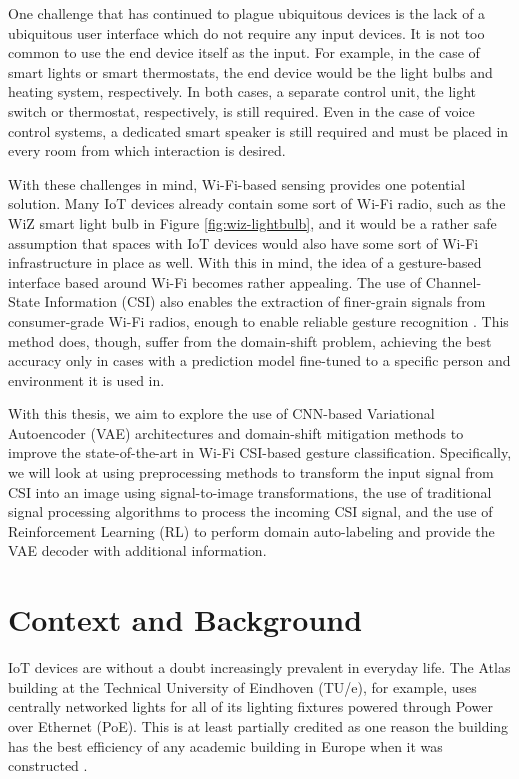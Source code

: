 One challenge that has continued to plague ubiquitous devices is the lack of a ubiquitous user interface which do not require any input devices.
It is not too common to use the end device itself as the input.
For example, in the case of smart lights or smart thermostats, the end device would be the light bulbs and heating system, respectively.
In both cases, a separate control unit, the light switch or thermostat, respectively, is still required.
Even in the case of voice control systems, a dedicated smart speaker is still required and must be placed in every room from which interaction is desired.

With these challenges in mind, Wi-Fi-based sensing provides one potential solution.
Many IoT devices already contain some sort of Wi-Fi radio, such as the WiZ smart light bulb in Figure \ref{fig:wiz-lightbulb}, and it would be a rather safe assumption that spaces with IoT devices would also have some sort of Wi-Fi infrastructure in place as well.
With this in mind, the idea of a gesture-based interface based around Wi-Fi becomes rather appealing.
The use of Channel-State Information (CSI) also enables the extraction of finer-grain signals from consumer-grade Wi-Fi radios, enough to enable reliable gesture recognition \cite{adib2013see}.
This method does, though, suffer from the domain-shift problem, achieving the best accuracy only in cases with a prediction model fine-tuned to a specific person and environment it is used in.

With this thesis, we aim to explore the use of CNN-based Variational Autoencoder (VAE) architectures and domain-shift mitigation methods to improve the state-of-the-art in Wi-Fi CSI-based gesture classification.
Specifically, we will look at using preprocessing methods to transform the input signal from CSI into an image using signal-to-image transformations, the use of traditional signal processing algorithms to process the incoming CSI signal, and the use of Reinforcement Learning (RL) to perform domain auto-labeling and provide the VAE decoder with additional information.

\section{Context and Background}\label{sec:intro-context}

IoT devices are without a doubt increasingly prevalent in everyday life.
The Atlas building at the Technical University of Eindhoven (TU/e), for example, uses centrally networked lights for all of its lighting fixtures powered through Power over Ethernet (PoE). 
This is at least partially credited as one reason the building has the best efficiency of any academic building in Europe when it was constructed \cite{tue2019atlas}.

